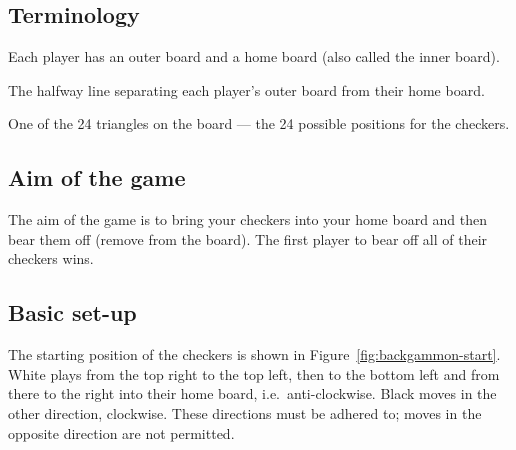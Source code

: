 \documentclass[11pt]{article}
\begin{document}
\subsection*{Terminology}
Each player has an outer board and a home board (also called the inner board).
\begin{description}[leftmargin=2.5cm, style=nextline]
    \item[Bar] The halfway line separating each player's outer board from their home board.
    \item[Point] One of the 24 triangles on the board — the 24 possible positions for the checkers.
\end{description}

\subsection*{Aim of the game}
The aim of the game is to bring your checkers into your home board and then bear them off (remove from the board). The first player to bear off all of their checkers wins.

\subsection*{Basic set-up}
The starting position of the checkers is shown in Figure~\ref{fig:backgammon-start}. White plays from the top right to the top left, then to the bottom left and from there to the right into their home board, i.e.\ anti-clockwise. Black moves in the other direction, clockwise. These directions must be adhered to; moves in the opposite direction are not permitted.

\end{document}
